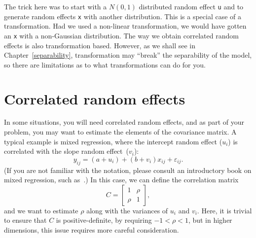 \documentclass{admbmanual}
\newcommand{\citeasnoun}{\cite}
\begin{document}
The trick here was to start with a $N(0,1)$ distributed random effect \texttt{u}
and to generate random effects \texttt{x} with another distribution. This is a
special case of a transformation. Had we used a non-linear transformation, we
would have gotten an \texttt{x} with a non-Gaussian distribution. The way we
obtain correlated random effects is also transformation based. However, as we
shall see in Chapter~\ref{separability}, transformation may ``break'' the
separability of the model, so there are limitations as to what transformations
can do for you.

\section{Correlated random effects\label{sec:correlated}}

In some situations, you will need correlated random effects, and as part of your
problem, you may want to estimate the elements of the covariance matrix. A
typical example is mixed regression, where the intercept random effect ($u_i$)
is correlated with the slope random effect~($v_i$):
\[
y_{ij}=(a+u_i)+\left(b+v_i\right)x_{ij}+\varepsilon_{ij}.
\]
(If you are not familiar with the notation, please consult an introductory book
on mixed regression, such as~\citeasnoun{pinh:bate:2000}.) In this case, we can
define the correlation matrix
\[
C=\left[\begin{array}{cc}
    1    & \rho                \\
    \rho & 1\end{array}\right],
\]
and we want to estimate $\rho$ along with the variances of $u_i$ and $v_i$.
Here, it is trivial to ensure that $C$ is positive-definite, by requiring
$-1<\rho<1$, but in higher dimensions, this issue requires more careful
consideration.
\end{document}
